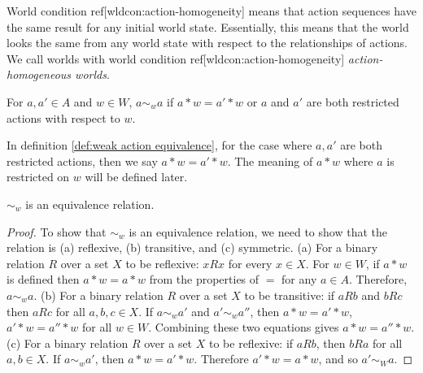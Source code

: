 World condition ref[wldcon:action-homogeneity] means that action sequences have the same result for any initial world state.
Essentially, this means that the world looks the same from any world state with respect to the relationships of actions.
We call worlds with world condition ref[wldcon:action-homogeneity] \textit{action-homogeneous worlds}.

\begin{definition}\label{def:weak action equivalence}
	For $a,a' \in A$ and $w \in W$, $a \sim_{w} a$ if $a * w = a' * w$ or $a$ and $a'$ are both restricted actions with respect to $w$.
\end{definition}

\begin{remark}
	In definition \ref{def:weak action equivalence}, for the case where $a, a'$ are both restricted actions, then we say $a * w = a' * w$.
	The meaning of $a * w$ where $a$ is restricted on $w$ will be defined later.
\end{remark}

\begin{proposition}
	$\sim_{w}$ is an equivalence relation.
\end{proposition}
\begin{proof}
	To show that $\sim_{w}$ is an equivalence relation, we need to show that the relation is (a) reflexive, (b) transitive, and (c) symmetric.
	(a) For a binary relation $R$ over a set $X$ to be reflexive: $x R x$ for every $x \in X$.
	For $w \in W$, if $a * w$ is defined then $a * w = a * w$ from the properties of $=$ for any $a \in A$.
	Therefore, $a \sim_{w} a$.
	(b) For a binary relation $R$ over a set $X$ to be transitive: if $a R b$ and $b R c$ then $a R c$ for all $a,b,c \in X$.
	If $a \sim_{w} a'$ and $a' \sim_{w} a''$, then $a * w = a' * w$, $a' * w = a'' * w$ for all $w \in W$.
	Combining these two equations gives $a * w = a'' * w$.
	(c) For a binary relation $R$ over a set $X$ to be reflexive: if $a R b$, then $b R a$ for all $a,b \in X$.
	If $a \sim_{w} a'$, then $a * w = a' * w$. Therefore $a' * w = a * w$, and so $a' \sim_{W} a$.
\end{proof}

